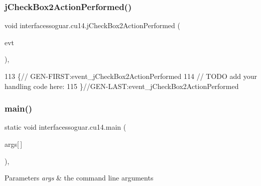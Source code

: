 \subsubsection{\texorpdfstring{j\+Check\+Box2\+Action\+Performed()}{jCheckBox2ActionPerformed()}}
{\footnotesize\ttfamily void interfacessoguar.\+cu14.\+j\+Check\+Box2\+Action\+Performed (\begin{DoxyParamCaption}\item[{java.\+awt.\+event.\+Action\+Event}]{evt }\end{DoxyParamCaption})\hspace{0.3cm}{\ttfamily [inline]}, {\ttfamily [private]}}


\begin{DoxyCode}
113                                                                            \{\textcolor{comment}{//
      GEN-FIRST:event\_jCheckBox2ActionPerformed}
114         \textcolor{comment}{// TODO add your handling code here:}
115     \}\textcolor{comment}{//GEN-LAST:event\_jCheckBox2ActionPerformed}
\end{DoxyCode}
\mbox{\label{classinterfacessoguar_1_1cu14_a35674955efbc5d934ec6d0e2c2123977}} 
\subsubsection{\texorpdfstring{main()}{main()}}
{\footnotesize\ttfamily static void interfacessoguar.\+cu14.\+main (\begin{DoxyParamCaption}\item[{String}]{args\mbox{[}$\,$\mbox{]} }\end{DoxyParamCaption})\hspace{0.3cm}{\ttfamily [inline]}, {\ttfamily [static]}}


\begin{DoxyParams}{Parameters}
{\em args} & the command line arguments \\
\hline
\end{DoxyParams}

